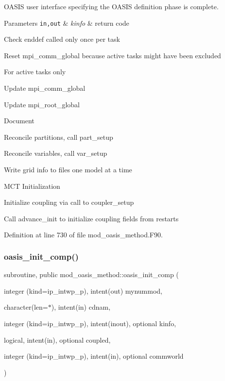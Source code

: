 O\+A\+S\+IS user interface specifying the O\+A\+S\+IS definition phase is complete. 


\begin{DoxyParams}[1]{Parameters}
\mbox{\tt in,out}  & {\em kinfo} & return code \\
\hline
\end{DoxyParams}

\begin{DoxyItemize}
\item Check enddef called only once per task
\item Reset mpi\+\_\+comm\+\_\+global because active tasks might have been excluded
\item For active tasks only
\begin{DoxyItemize}
\item Update mpi\+\_\+comm\+\_\+global
\item Update mpi\+\_\+root\+\_\+global
\item Document
\item Reconcile partitions, call part\+\_\+setup
\item Reconcile variables, call var\+\_\+setup
\item Write grid info to files one model at a time
\item M\+CT Initialization
\item Initialize coupling via call to coupler\+\_\+setup
\item Call advance\+\_\+init to initialize coupling fields from restarts 
\end{DoxyItemize}
\end{DoxyItemize}

Definition at line 730 of file mod\+\_\+oasis\+\_\+method.\+F90.

\mbox{\label{namespacemod__oasis__method_ad266b77f6e75f2d150c80374a841a43c}} 
\subsubsection{\texorpdfstring{oasis\+\_\+init\+\_\+comp()}{oasis\_init\_comp()}}
{\footnotesize\ttfamily subroutine, public mod\+\_\+oasis\+\_\+method\+::oasis\+\_\+init\+\_\+comp (\begin{DoxyParamCaption}\item[{integer (kind=ip\+\_\+intwp\+\_\+p), intent(out)}]{mynummod,  }\item[{character(len=$\ast$), intent(in)}]{cdnam,  }\item[{integer (kind=ip\+\_\+intwp\+\_\+p), intent(inout), optional}]{kinfo,  }\item[{logical, intent(in), optional}]{coupled,  }\item[{integer (kind=ip\+\_\+intwp\+\_\+p), intent(in), optional}]{commworld }\end{DoxyParamCaption})}



